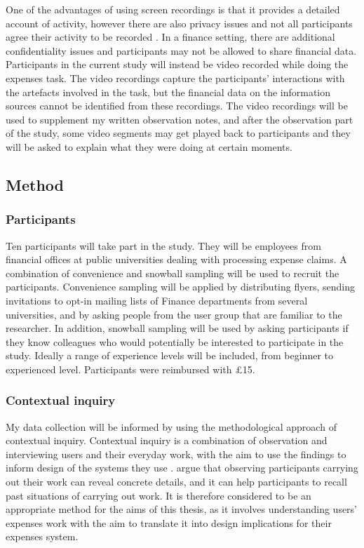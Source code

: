 One of the advantages of using screen recordings is that it provides a detailed account of activity, however there are also privacy issues and not all participants agree their activity to be recorded \citep{Rule2015}. In a finance setting, there are additional confidentiality issues and participants may not be allowed to share financial data. Participants in the current study will instead be video recorded while doing the expenses task. The video recordings capture the participants' interactions with the artefacts involved in the task, but the financial data on the information sources cannot be identified from these recordings. The video recordings will be used to supplement my written observation notes, and after the observation part of the study, some video segments may get played back to participants and they will be asked to explain what they were doing at certain moments.

\subsection{Method}
\subsubsection{Participants}
Ten participants will take part in the study. They will be employees from financial offices at public universities dealing with processing expense claims. A combination of convenience and snowball sampling will be used to recruit the participants. Convenience sampling will be applied by distributing flyers, sending invitations to opt-in mailing lists of Finance departments from several universities, and by asking people from the user group that are familiar to the researcher. In addition, snowball sampling will be used by asking participants if they know colleagues who would potentially be interested to participate in the study. 
Ideally a range of experience levels will be included, from beginner to experienced level. Participants were reimbursed with \pounds15.

\subsubsection{Contextual inquiry}
My data collection will be informed by using the methodological approach of contextual inquiry.
Contextual inquiry is a combination of observation and interviewing users and their everyday work, with the aim to use the findings to inform design of the systems they use \citep{Beyer1998}.
\citet{Beyer1998} argue that observing participants carrying out their work can reveal concrete details, and it can help participants to recall past situations of carrying out work. It is therefore considered to be an appropriate method for the aims of this thesis, as it involves understanding users' expenses work with the aim to translate it into design implications for their expenses system. 

